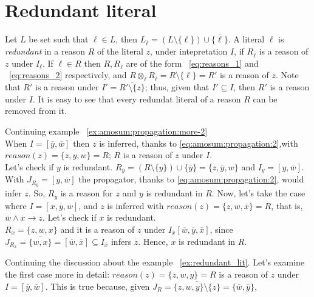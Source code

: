 \section{Redundant literal}
\label{sec:redundant_literal}
Let $L$ be set such that $\ell \in L$,
then $L_{\overline{\ell}} = (L \setminus \{\ell\}) \cup \{\overline{\ell}\}$.
A literal $\ell$ is \textit{redundant} in a reason $R$ of the literal $z$, under intepretation $I$, 
if $R_{\overline{\ell}}$ is a reason of $z$ under $I_{\ell}$.
If $\ell \in R$ then  $R,R_{\overline{\ell}}$ are of the form ~\ref{eq:reasons_1} and 
~\ref{eq:reasons_2} respectively,
and $R \otimes_{\ell} R_{\overline{\ell}} = R \setminus \{\ell\} = R'$ is a reason of $z$.
Note that $R'$ is a reason under  $I' = \overline{R' \setminus \{z\}}$; 
thus, given that $I' \subseteq I$, then $R'$ is a reason under $I$.
It is easy to see that every redundat literal of a reason $R$ can be removed from it.
\begin{example}{Continuing example ~\ref{ex:amosum:propagation:more-2}}\\
    \label{ex:redundant_lit}
    When $I = [\overline{y}, \overline{w}]$ then $z$ is inferred,
    thanks to \eqref{eq:amosum:propagation:2},with $\mathit{reason}(z) = \{z,y,w\} = R$;
    $R$ is a reason of $z$ under $I$.\\
    Let's check if $y$ is redundant.
    $R_{\overline{y}} = (R \setminus \{y\}) \cup \{\overline{y}\} = \{z,\overline{y},w\}$ and $I_{y} = [y,\overline{w}]$.
    With $J_{R_{\overline{y}}} = [y,\overline{w}]$ the propagator, thanks to \eqref{eq:amosum:propagation:2}, 
    would infer $z$.
    So, $R_{\overline{y}}$ is a reason for $z$
    and $y$ is redundant in $R$.
    Now, let's take the case where $I = [x, \overline{y}, \overline{w}]$, 
    and $z$ is inferred with $\mathit{reason}(z) = \{z, w, \overline{x}\} = R$, that is, 
    $\overline{w} \land  x \rightarrow z$.
    Let's check if $\overline{x}$ is redundant.\\
    $R_{x} = \{z, w, x\}$ and it is a reason of $z$ under $I_{\overline{x}}[\overline{w}, \overline{y},\overline{x}]$, 
    since $J_{R_x} = \overline{\{w, x\}} = [\overline{w},\overline{x}] \subseteq I_{\overline{x}}$
    infers $z$. Hence, $x$ is redundant in $R$.
\end{example}
Continuing the discussion about the example ~\ref{ex:redundant_lit}.
Let's examine the first case more in detail: $\mathit{reason}(z) = \{z, w, y\} = R $ is a 
reason of $z$ under $I = [\overline{y}, \overline{w}]$. This is true because,
given $J_R = \overline{\{z, w, y\} \setminus \{z\}} = \{\overline{w},\overline{y}\} $,
